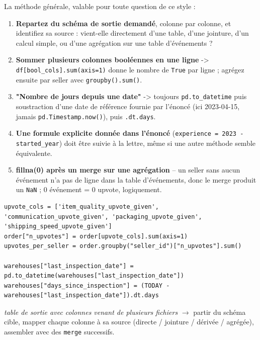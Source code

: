 \documentclass[11pt]{article}
\begin{document}
\begin{explik}
La m\'ethode g\'en\'erale, valable pour toute question de ce style :
\begin{enumerate}[nosep]
  \item \textbf{Repartez du sch\'ema de sortie demand\'e}, colonne par
        colonne, et identifiez sa source : vient-elle directement d'une
        table, d'une jointure, d'un calcul simple, ou d'une agr\'egation
        sur une table d'\'ev\'enements ?
  \item \textbf{Sommer plusieurs colonnes bool\'eennes en une ligne} ->
        \texttt{df[bool\_cols].sum(axis=1)} donne le nombre de
        \texttt{True} par ligne ; agr\'egez ensuite par seller avec
        \texttt{groupby().sum()}.
  \item \textbf{"Nombre de jours depuis une date"} -> toujours
        \texttt{pd.to\_datetime} puis soustraction d'une date de r\'ef\'erence
        fournie par l'\'enonc\'e (ici 2023-04-15, jamais
        \texttt{pd.Timestamp.now()}), puis \texttt{.dt.days}.
  \item \textbf{Une formule explicite donn\'ee dans l'\'enonc\'e}
        (\texttt{experience = 2023 - started\_year}) doit \^etre suivie
        \`a la lettre, m\^eme si une autre m\'ethode semble \'equivalente.
  \item \textbf{fillna(0) apr\`es un merge sur une agr\'egation} -- un
        seller sans aucun \'ev\'enement n'a pas de ligne dans la
        table d'\'ev\'enements, donc le merge produit un \texttt{NaN} ; 0
        \'ev\'enement = 0 upvote, logiquement.
\end{enumerate}
\end{explik}

\begin{lstlisting}
upvote_cols = ['item_quality_upvote_given', 'communication_upvote_given', 'packaging_upvote_given', 'shipping_speed_upvote_given']
order["n_upvotes"] = order[upvote_cols].sum(axis=1)
upvotes_per_seller = order.groupby("seller_id")["n_upvotes"].sum()

warehouses["last_inspection_date"] = pd.to_datetime(warehouses["last_inspection_date"])
warehouses["days_since_inspection"] = (TODAY - warehouses["last_inspection_date"]).dt.days
\end{lstlisting}

\begin{pat}
\emph{\og table de sortie avec colonnes venant de plusieurs fichiers \fg}
$\to$ partir du sch\'ema cible, mapper chaque colonne \`a sa source
(directe / jointure / d\'eriv\'ee / agr\'eg\'ee), assembler avec des
\texttt{merge} successifs.
\end{pat}
\end{document}
